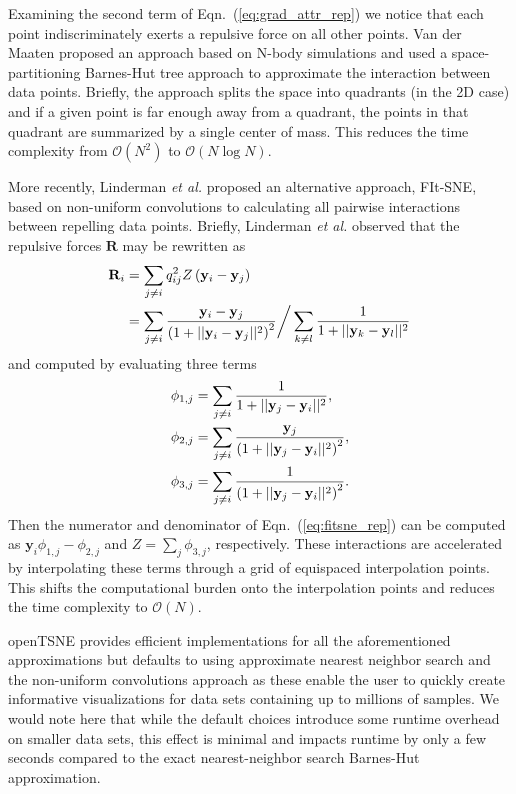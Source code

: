 \documentclass[twocolumn]{bmcart}
\begin{document}
Examining the second term of Eqn.~(\ref{eq:grad_attr_rep}) we notice that each point indiscriminately exerts a repulsive force on all other points. Van der Maaten proposed an approach based on N-body simulations and used a space-partitioning Barnes-Hut tree approach to approximate the interaction between data points. Briefly, the approach splits the space into quadrants (in the 2D case) and if a given point is far enough away from a quadrant, the points in that quadrant are summarized by a single center of mass. This reduces the time complexity from $\mathcal{O}(N^2)$ to $\mathcal{O}(N \log N)$.

More recently, Linderman \textit{et al.} proposed an alternative approach, FIt-SNE, based on non-uniform convolutions to calculating all pairwise interactions between repelling data points. Briefly, Linderman \textit{et al.} observed that the repulsive forces $\mathbf{R}$ may be rewritten as
\begin{align}
\mathbf{R}_i &= \sum_{j \neq i} q_{ij}^2 Z \left ( \mathbf{y}_i - \mathbf{y}_j \right ) \notag \\
&= \sum_{j \neq i} \frac{\mathbf{y}_i - \mathbf{y}_j}{\left ( 1 + || \mathbf{y}_i - \mathbf{y}_j ||^2 \right )^{2}}
\bigg/
\sum_{k \neq l} \frac{1}{1 + || \mathbf{y}_k - \mathbf{y}_l || ^2} \label{eq:fitsne_rep}
\end{align} 
and computed by evaluating three terms
\begin{align}
\phi_{1, j} &= \sum_{j \neq i} \frac{1}{1 + || \mathbf{y}_j - \mathbf{y}_i ||^2}, \notag \\
\phi_{2, j} &= \sum_{j \neq i} \frac{\mathbf{y}_j}{\left( 1 + || \mathbf{y}_j - \mathbf{y}_i ||^2 \right)^2}, \notag \\
\phi_{3, j} &= \sum_{j \neq i} \frac{1}{\left( 1 + || \mathbf{y}_j - \mathbf{y}_i ||^2 \right)^2}. \label{eq:fitsne_terms}
\end{align}
Then the numerator and denominator of Eqn.~(\ref{eq:fitsne_rep}) can be computed as $\mathbf{y}_i \phi_{1,j} - \phi_{2,j}$ and $Z = \sum_j \phi_{3,j}$, respectively. These interactions are accelerated by interpolating these terms through a grid of equispaced interpolation points. This shifts the computational burden onto the interpolation points and reduces the time complexity to $\mathcal{O}(N)$.

openTSNE provides efficient implementations for all the aforementioned approximations but defaults to using approximate nearest neighbor search and the non-uniform convolutions approach as these enable the user to quickly create informative visualizations for data sets containing up to millions of samples. We would note here that while the default choices introduce some runtime overhead on smaller data sets, this effect is minimal and impacts runtime by only a few seconds compared to the exact nearest-neighbor search Barnes-Hut approximation.
\end{document}
